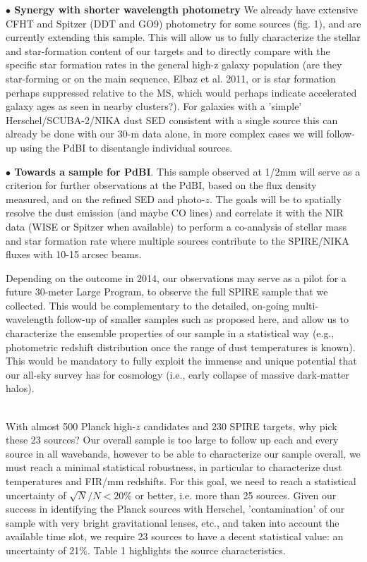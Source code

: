 \documentclass[11pt,a4]{article}
\begin{document}
{\bf {$\bullet$} Synergy with shorter wavelength photometry} We
already have extensive CFHT and Spitzer (DDT and GO9) photometry for
some sources (fig. 1), and are currently extending this sample. This
will allow us to fully characterize the stellar and star-formation
content of our targets and to directly compare with the specific star
formation rates in the general high-z galaxy population (are they
star-forming or on the main sequence, Elbaz et al. 2011, or is star
formation perhaps suppressed relative to the MS, which would perhaps
indicate accelerated galaxy ages as seen in nearby clusters?). For
galaxies with a 'simple' Herschel/SCUBA-2/NIKA dust SED consistent
with a single source this can already be done with our 30-m data
alone, in more complex cases we will follow-up using the PdBI to
disentangle individual sources.

{\bf {$\bullet$} Towards a sample for PdBI}.  This sample observed at
1/2mm will serve as a criterion for further observations at the PdBI,
based on the flux density measured, and on the refined SED and
photo-$z$. The goals will be to spatially resolve the dust emission
(and maybe CO lines) and correlate it with the NIR data (WISE or
Spitzer when available) to perform a co-analysis of stellar mass and
star formation rate where multiple sources contribute to the
SPIRE/NIKA fluxes with 10-15 arcsec beams.


\noindent Depending on the outcome in 2014, our observations may
serve as a pilot for a future 30-meter Large Program, to observe the
full SPIRE sample that we collected.  This would be complementary
to the detailed, on-going multi-wavelength follow-up of smaller
samples such as proposed here, and allow us to characterize the
ensemble properties of our sample in a statistical way (e.g.,
photometric redshift distribution once the range of dust temperatures
is known). This would be mandatory to fully exploit the immense and
unique potential that our all-sky survey has for cosmology (i.e.,
early collapse of massive dark-matter halos).

\vspace{0.4cm}

\\
 With almost 500 Planck high-$z$
candidates and 230 SPIRE targets, why pick these 23 sources? Our
overall sample is too large to follow up each and every source in all
wavebands, however to be able to characterize our sample overall, we
must reach a minimal statistical robustness, in particular to
characterize dust temperatures and FIR/mm redshifts. For this goal, we
need to reach a statistical uncertainty of $\sqrt{N}/N<20$\% or
better, i.e. more than 25 sources. Given our success in identifying
the Planck sources with Herschel, 'contamination' of our sample with
very bright gravitational lenses, etc., and taken into account the
available time slot, we require 23 sources to have a decent
statistical value: an uncertainty of 21\%. Table 1 highlights the
source characteristics.
\end{document}
